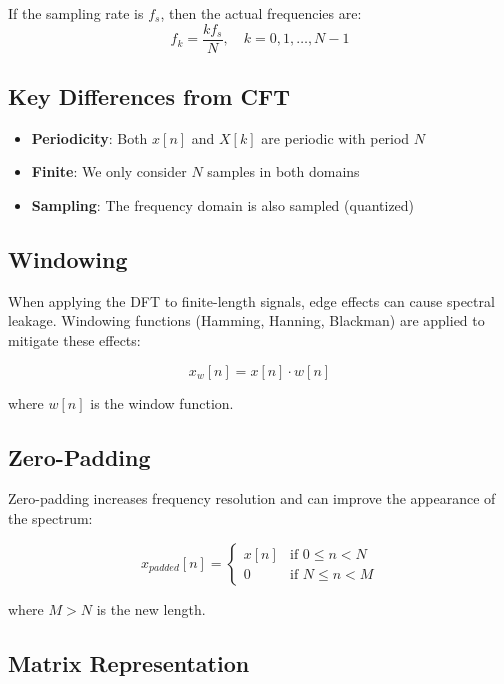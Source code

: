 \documentclass[11pt,a4paper]{article}
\begin{document}
If the sampling rate is $f_s$, then the actual frequencies are:
\begin{equation}
f_k = \frac{k f_s}{N}, \quad k = 0, 1, \ldots, N-1
\end{equation}

\subsection{Key Differences from CFT}

\begin{itemize}
    \item \textbf{Periodicity}: Both $x[n]$ and $X[k]$ are periodic with period $N$
    \item \textbf{Finite}: We only consider $N$ samples in both domains
    \item \textbf{Sampling}: The frequency domain is also sampled (quantized)
\end{itemize}

\subsection{Windowing}

When applying the DFT to finite-length signals, edge effects can cause spectral leakage. Windowing functions (Hamming, Hanning, Blackman) are applied to mitigate these effects:

\begin{equation}
x_w[n] = x[n] \cdot w[n]
\end{equation}

where $w[n]$ is the window function.

\subsection{Zero-Padding}

Zero-padding increases frequency resolution and can improve the appearance of the spectrum:

\begin{equation}
x_{padded}[n] = \begin{cases}
x[n] & \text{if } 0 \leq n < N \\
0 & \text{if } N \leq n < M
\end{cases}
\end{equation}

where $M > N$ is the new length.

\subsection{Matrix Representation}
\end{document}
